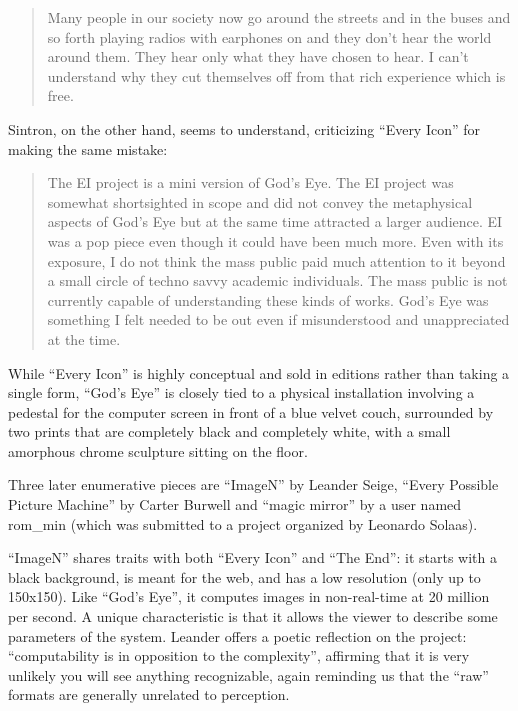 \documentclass{thesis}
\begin{document}
\begin{quote}
Many people in our society now go around the streets and in the buses and so forth playing radios with earphones on and they don't hear the world around them. They hear only what they have chosen to hear. I can't understand why they cut themselves off from that rich experience which is free.
\end{quote}

Sintron, on the other hand, seems to understand, criticizing ``Every Icon'' for making the same mistake:\cite{olga_goriunova_and_alexei_shulgin_touching_2003}

	\begin{quote}
	The EI project is a mini version of God's Eye. The EI project was somewhat shortsighted in scope and did not convey the metaphysical aspects of God's Eye but at the same time attracted a larger audience. EI was a pop piece even though it could have been much more. Even with its exposure, I do not think the mass public paid much attention to it beyond a small circle of techno savvy academic individuals. The mass public is not currently capable of understanding these kinds of works. God's Eye was something I felt needed to be out even if misunderstood and unappreciated at the time.
	\end{quote}
	
While ``Every Icon'' is highly conceptual and sold in editions rather than taking a single form, ``God's Eye'' is closely tied to a physical installation involving a pedestal for the computer screen in front of a blue velvet couch, surrounded by two prints that are completely black and completely white, with a small amorphous chrome sculpture sitting on the floor. 
		
Three later enumerative pieces are ``ImageN'' by Leander Seige\cite{leander_seige_imagen_????}, ``Every Possible Picture Machine'' by Carter Burwell\cite{carter_burwell_every_????} and ``magic mirror'' by a user named rom\_min\cite{leonardo_solaas_magic_????} (which was submitted to a project organized by Leonardo Solaas).
	
``ImageN'' shares traits with both ``Every Icon'' and ``The End'': it starts with a black background, is meant for the web, and has a low resolution (only up to 150x150). Like ``God's Eye'', it computes images in non-real-time at 20 million per second. A unique characteristic is that it allows the viewer to describe some parameters of the system. Leander offers a poetic reflection on the project: ``computability is in opposition to the complexity'', affirming that it is very unlikely you will see anything recognizable, again reminding us that the ``raw'' formats are generally unrelated to perception.
	
\end{document}
